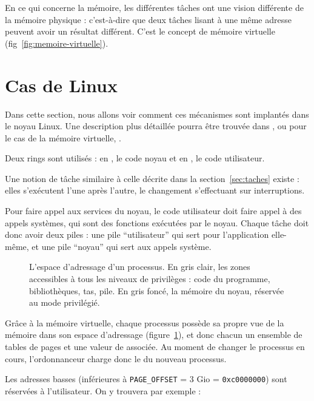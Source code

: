 En ce qui concerne la mémoire, les différentes tâches ont une vision différente
de la mémoire physique : c'est-à-dire que deux tâches lisant à une même adresse
peuvent avoir un résultat différent. C'est le concept de mémoire virtuelle
(fig~\ref{fig:memoire-virtuelle}).


\section{Cas de Linux}

Dans cette section, nous allons voir comment ces mécanismes sont implantés dans
le noyau Linux. Une description plus détaillée pourra être trouvée dans
\cite{UnderstandingTheLinuxKernel}, ou pour le cas de la mémoire virtuelle,
\cite{LinuxVMM}.

Deux rings sont utilisés : en , le code noyau et en , le code
utilisateur.

Une notion de tâche similaire à celle décrite dans la section~\ref{sec:taches}
existe : elles s'exécutent l'une après l'autre, le changement s'effectuant sur
interruptions.

Pour faire appel aux services du noyau, le code utilisateur doit faire appel à
des appels systèmes, qui sont des fonctions exécutées par le noyau. Chaque tâche
doit donc avoir deux piles : une pile ``utilisateur'' qui sert pour
l'application elle-même, et une pile ``noyau'' qui sert aux appels système.

\begin{figure} %
\centering
\fbox{
  
}

\caption[Espace d'adressage d'un processus]{L'espace d'adressage d'un processus.
En gris clair, les zones accessibles à tous les niveaux de privilèges : code du
programme, bibliothèques, tas, pile. En gris foncé, la mémoire du noyau,
réservée au mode privilégié.}

\label{fig:memmap}
\end{figure}

Grâce à la mémoire virtuelle, chaque processus possède sa propre vue de la
mémoire dans son espace d'adressage (figure~\ref{fig:memmap}), et donc chacun
un ensemble de tables de pages et une valeur de \crtrois associée. Au moment de
changer le processus en cours, l'ordonnanceur charge donc le \crtrois du nouveau
processus.

Les adresses basses (inférieures à \texttt{PAGE\_OFFSET} = 3 Gio =
\texttt{0xc0000000}) sont réservées à l'utilisateur. On y trouvera par exemple :


